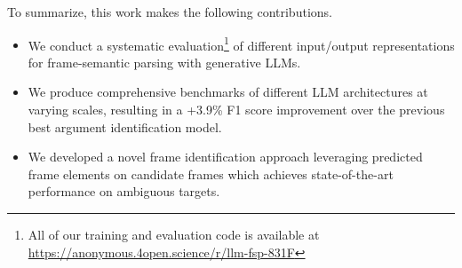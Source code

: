 To summarize, this work makes the following contributions.
\begin{itemize}[noitemsep,topsep=0pt,leftmargin=*]
    \item We conduct a systematic evaluation\footnote{All of our training and evaluation code is available at \url{https://anonymous.4open.science/r/llm-fsp-831F}} of different input/output representations for frame-semantic parsing with generative LLMs.
    \item We produce comprehensive benchmarks of different LLM architectures at varying scales, resulting in a +3.9\% F1 score improvement over the previous best argument identification model. 
    \item We developed a novel frame identification approach leveraging predicted frame elements on candidate frames which achieves state-of-the-art performance on ambiguous targets.
\end{itemize}






